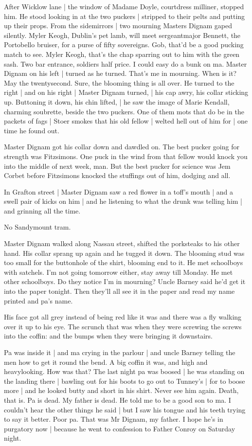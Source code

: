 After Wicklow lane |
the window of Madame Doyle, courtdress milliner,
stopped him.
He stood looking in at the two puckers |
stripped to their pelts and putting up their props.
From the sidemirrors |
two mourning Masters Dignam gaped silently.
Myler Keogh, Dublin's pet lamb,
will meet sergeantmajor Bennett, the Portobello bruiser,
for a purse of fifty sovereigns.
Gob, that'd be a good pucking match to see.
Myler Keogh, that's the chap sparring out to him with the green sash.
Two bar entrance, soldiers half price.
I could easy do a bunk on ma.
Master Dignam on his left |
turned as he turned.
That's me in mourning.
When is it?
May the twentysecond.
Sure, the blooming thing is all over.
He turned to the right |
and on his right |
Master Dignam turned, |
his cap awry, his collar sticking up.
Buttoning it down, his chin lifted, |
he saw the image of Marie Kendall, charming soubrette,
beside the two puckers.
One of them mots that do be in the packets of fags |
Stoer smokes that his old fellow |
welted hell out of him for |
one time he found out.

Master Dignam got his collar down and dawdled on.
The best pucker
going for strength was Fitzsimons.
One puck in the wind from that fellow
would knock you into the middle of next week, man.
But the best pucker
for science
was Jem Corbet
before Fitzsimons knocked the stuffings out of
him,
dodging and all.

In Grafton street |
Master Dignam saw a red flower in a toff's mouth |
and a swell pair of kicks on him |
and he listening to what the drunk was telling him |
and grinning all the time.

No Sandymount tram.

Master Dignam walked along Nassau street,
shifted the porksteaks to his other hand.
His collar sprang up again and he tugged it down.
The blooming stud was too small for the buttonhole of the shirt,
blooming end to it.
He met schoolboys with satchels.
I'm not going tomorrow either,
stay away till Monday.
He met other schoolboys.
Do they notice I'm in mourning?
Uncle Barney said he'd get it into the paper tonight.
Then they'll all see it in the paper
and read my name printed and pa's name.

His face got all grey
instead of being red like it was
and there was a
fly walking over it
up to his eye.
The scrunch that was
when they were
screwing the screws into the coffin:
and the bumps when they were bringing
it downstairs.

Pa was inside it |
and ma crying in the parlour |
and uncle Barney telling the men
how to get it round the bend.
A big coffin it was,
and high and heavylooking.
How was that?
The last night pa was boosed |
he was standing on the landing there |
bawling out for his boots to go out to Tunney's |
for to boose more |
and he looked butty and short in his shirt.
Never see him again.
Death, that is.
Pa is dead.
My father is dead.
He told me to be a good son to ma.
I couldn't hear the other things he said |
but I saw his tongue and his teeth trying to say it better.
Poor pa.
That was Mr Dignam, my father.
I hope he's in purgatory now |
because he went to confession to Father Conroy on Saturday night.


